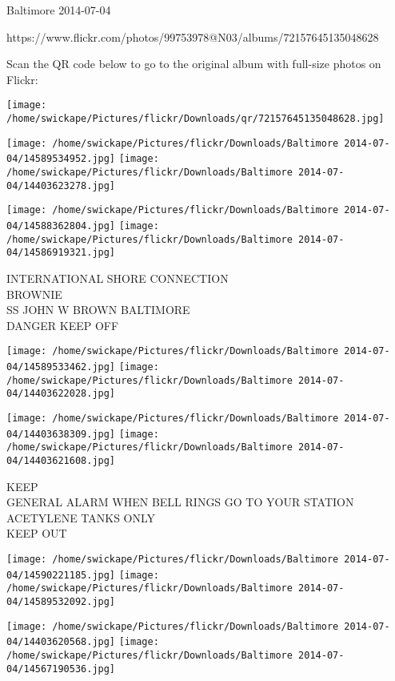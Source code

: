 \documentclass[10pt,letterpaper]{article}
\begin{document}
Baltimore 2014-07-04

https://www.flickr.com/photos/99753978@N03/albums/72157645135048628

Scan the QR code below to go to the original album with full-size photos on Flickr:

\texttt{[image: /home/swickape/Pictures/flickr/Downloads/qr/72157645135048628.jpg]}
\pagebreak

\texttt{[image: /home/swickape/Pictures/flickr/Downloads/Baltimore 2014-07-04/14589534952.jpg]}
\texttt{[image: /home/swickape/Pictures/flickr/Downloads/Baltimore 2014-07-04/14403623278.jpg]}

\texttt{[image: /home/swickape/Pictures/flickr/Downloads/Baltimore 2014-07-04/14588362804.jpg]}
\texttt{[image: /home/swickape/Pictures/flickr/Downloads/Baltimore 2014-07-04/14586919321.jpg]}

INTERNATIONAL SHORE CONNECTION\\
BROWNIE\\
SS JOHN W BROWN BALTIMORE\\
DANGER KEEP OFF\\
\pagebreak

\texttt{[image: /home/swickape/Pictures/flickr/Downloads/Baltimore 2014-07-04/14589533462.jpg]}
\texttt{[image: /home/swickape/Pictures/flickr/Downloads/Baltimore 2014-07-04/14403622028.jpg]}

\texttt{[image: /home/swickape/Pictures/flickr/Downloads/Baltimore 2014-07-04/14403638309.jpg]}
\texttt{[image: /home/swickape/Pictures/flickr/Downloads/Baltimore 2014-07-04/14403621608.jpg]}

KEEP\\
GENERAL ALARM WHEN BELL RINGS GO TO YOUR STATION\\
ACETYLENE TANKS ONLY\\
KEEP OUT\\
\pagebreak

\texttt{[image: /home/swickape/Pictures/flickr/Downloads/Baltimore 2014-07-04/14590221185.jpg]}
\texttt{[image: /home/swickape/Pictures/flickr/Downloads/Baltimore 2014-07-04/14589532092.jpg]}

\texttt{[image: /home/swickape/Pictures/flickr/Downloads/Baltimore 2014-07-04/14403620568.jpg]}
\texttt{[image: /home/swickape/Pictures/flickr/Downloads/Baltimore 2014-07-04/14567190536.jpg]}
\end{document}
